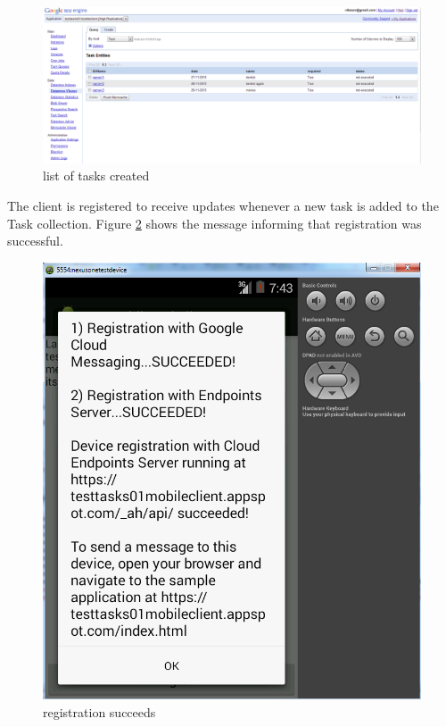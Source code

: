 \begin{figure}[ht]
	\centering
	\includegraphics[scale=0.5]{images/googlecloud__taskexist.png}
	\caption{list of tasks created}
	\label{mobile_task_list_figure}
\end{figure}

The client is registered to receive updates whenever a new task is added to the Task collection. Figure \ref{mobile_registration_figure} shows the message informing that registration was successful.\\
\begin{figure}[ht]
	\centering
	\includegraphics[scale=0.7]{images/googlemessagin_isonline_cloudmessaging.png}
	\caption{registration succeeds}
	\label{mobile_registration_figure}
\end{figure}


